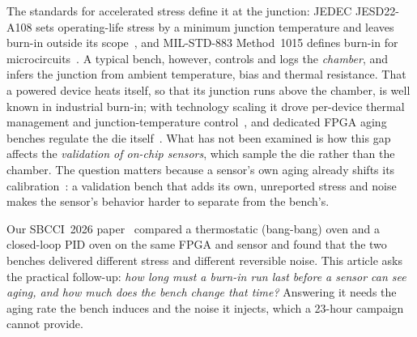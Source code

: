 \documentclass[10pt,twocolumn]{article}
\begin{document}
The standards for accelerated stress define it at the junction: JEDEC JESD22-A108 sets operating-life stress by a minimum junction temperature and leaves burn-in outside its scope~\cite{jedec}, and MIL-STD-883 Method~1015 defines burn-in for microcircuits~\cite{mil}. A typical bench, however, controls and logs the \emph{chamber}, and infers the junction from ambient temperature, bias and thermal resistance. That a powered device heats itself, so that its junction runs above the chamber, is well known in industrial burn-in; with technology scaling it drove per-device thermal management and junction-temperature control~\cite{vassighi,semenov}, and dedicated FPGA aging benches regulate the die itself~\cite{sobas}. What has not been examined is how this gap affects the \emph{validation of on-chip sensors}, which sample the die rather than the chamber. The question matters because a sensor's own aging already shifts its calibration~\cite{anik}: a validation bench that adds its own, unreported stress and noise makes the sensor's behavior harder to separate from the bench's.

Our SBCCI~2026 paper~\cite{sbcci26} compared a thermostatic (bang-bang) oven and a closed-loop PID oven on the same FPGA and sensor and found that the two benches delivered different stress and different reversible noise. This article asks the practical follow-up: \emph{how long must a burn-in run last before a sensor can see aging, and how much does the bench change that time?} Answering it needs the aging rate the bench induces and the noise it injects, which a 23-hour campaign cannot provide.
\end{document}

